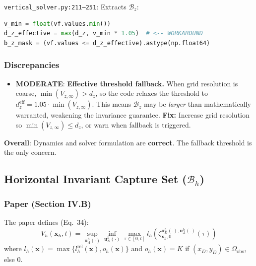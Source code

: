 \documentclass[11pt,a4paper]{article}
\begin{document}
\texttt{vertical\_solver.py:211--251}: Extracts $\mathcal{B}_z$:
\begin{lstlisting}[language=Python]
v_min = float(vf.values.min())
d_z_effective = max(d_z, v_min * 1.05)  # <-- WORKAROUND
b_z_mask = (vf.values <= d_z_effective).astype(np.float64)
\end{lstlisting}

\subsubsection{Discrepancies}

\begin{itemize}
\item \textcolor{modoran}{\textbf{MODERATE}}: \textbf{Effective threshold fallback.} When grid resolution is coarse, $\min(V_{z,\infty}) > d_z$, so the code relaxes the threshold to $d_z^{\mathrm{eff}} = 1.05 \cdot \min(V_{z,\infty})$. This means $\mathcal{B}_z$ may be \emph{larger} than mathematically warranted, weakening the invariance guarantee. \textbf{Fix:} Increase grid resolution so $\min(V_{z,\infty}) \leq d_z$, or warn when fallback is triggered.
\end{itemize}

\noindent\textbf{Overall}: Dynamics and solver formulation are \textbf{correct}. The fallback threshold is the only concern.

\subsection{Horizontal Invariant Capture Set ($\mathcal{B}_h$)}

\subsubsection{Paper (Section IV.B)}

The paper defines (Eq.~34):
\begin{equation}
V_h(\mathbf{x}_h, t) = \sup_{\mathbf{u}^h_A(\cdot)} \inf_{\mathbf{u}^h_D(\cdot)} \max_{\tau\in[0,t]} l_h\!\left(\zeta^{\mathbf{u}^h_D(\cdot),\mathbf{u}^h_A(\cdot)}_{\mathbf{x}_h,0}(\tau)\right)
\label{eq:Vh}
\end{equation}
where $l_h(\mathbf{x}) = \max\{l^{\mathrm{rel}}_h(\mathbf{x}), o_h(\mathbf{x})\}$ and $o_h(\mathbf{x}) = K$ if $(x_D, y_D) \in \Omega_{\mathrm{obs}}$, else $0$.
\end{document}
